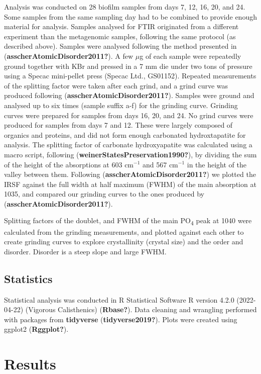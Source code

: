 \documentclass[
]{article}
\begin{document}
Analysis was conducted on 28 biofilm samples from days 7, 12, 16, 20,
and 24. Some samples from the same sampling day had to be combined to
provide enough material for analysis. Samples analysed for FTIR
originated from a different experiment than the metagenomic samples,
following the same protocol (as described above). Samples were analysed
following the method presented in (\textbf{asscherAtomicDisorder2011?}).
A few \(\mu\)g of each sample were repeatedly ground together with KBr
and pressed in a 7 mm die under two tons of pressure using a Specac
mini-pellet press (Specac Ltd., GS01152). Repeated measurements of the
splitting factor were taken after each grind, and a grind curve was
produced following (\textbf{asscherAtomicDisorder2011?}). Samples were
ground and analysed up to six times (sample suffix a-f) for the grinding
curve. Grinding curves were prepared for samples from days 16, 20, and
24. No grind curves were produced for samples from days 7 and 12. These
were largely composed of organics and proteins, and did not form enough
carbonated hydroxtapatite for analysis. The splitting factor of
carbonate hydroxyapatite was calculated using a macro script, following
(\textbf{weinerStatesPreservation1990?}), by dividing the sum of the
height of the absorptions at 603 cm\(^{-1}\) and 567 cm\(^{-1}\) in the
height of the valley between them. Following
(\textbf{asscherAtomicDisorder2011?}) we plotted the IRSF against the
full width at half maximum (FWHM) of the main absorption at 1035, and
compared our grinding curves to the ones produced by
(\textbf{asscherAtomicDisorder2011?}).

Splitting factors of the doublet, and FWHM of the main
PO\textsubscript{4} peak at 1040 were calculated from the grinding
measurements, and plotted against each other to create grinding curves
to explore crystallinity (crystal size) and the order and disorder.
Disorder is a steep slope and large FWHM.

\hypertarget{statistics}{%
\subsection{Statistics}\label{statistics}}

Statistical analysis was conducted in R Statistical Software R version
4.2.0 (2022-04-22) (Vigorous Calisthenics) (\textbf{Rbase?}). Data
cleaning and wrangling performed with packages from \textbf{tidyverse}
(\textbf{tidyverse2019?}). Plots were created using ggplot2
(\textbf{Rggplot?}).

\hypertarget{results}{%
\section{Results}\label{results}}
\end{document}
